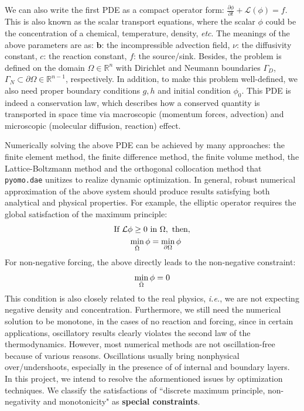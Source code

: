 \documentclass{article}
\begin{document}
We can also write the first PDE as a compact operator form: $\displaystyle {\frac{\partial \phi}{\partial t}}  + \mathcal{L}(\phi) =f$. This is also known as the scalar transport equations, where the scalar $\phi$ could be the concentration of a chemical, temperature, density, {\it{etc}}. The meanings of the above parameters are as: $\mathbf{b}$: the incompressible advection field, $\nu$: the diffusivity constant, $c$: the reaction constant, $f$: the source/sink. Besides, the problem is defined on the domain $\Omega \in \mathbb{R}^n$ with Dirichlet and Neumann boundaries $\Gamma_D$, $\Gamma_N \subset \partial \Omega \in \mathbb{R}^{n-1}$, respectively. In addition, to make this problem well-defined, we also need proper boundary conditions $g,h$ and initial condition $\phi_0$. This PDE is indeed a conservation law, which describes how a conserved quantity is transported in space time via macroscopic (momentum forces, advection) and microscopic (molecular diffusion, reaction) effect. \par

Numerically solving the above PDE can be achieved by many approaches: the finite element method\cite{evans2009enforcement}, the finite difference method\cite{stynes18}, the finite volume method\cite{lazarov1996finite}, the Lattice-Boltzmann method\cite{chai2013lattice} and the orthogonal collocation method\cite{biegler2010nonlinear} \cite{nicholson2018pyomo} that \texttt{pyomo.dae} unitizes to realize dynamic optimization. In general, robust numerical approximation of the above system should produce results satisfying both analytical and physical properties\cite{evans2009enforcement}. For example, the elliptic operator requires the global satisfaction of the maximum principle\cite{burman2005stabilized}\cite{evans2009enforcement}:
\begin{align*}
    \text{If} \ \mathcal{L}\phi \geq 0 \ &\text{in} \ \Omega, \ \text{then},\\
    \min_{\Bar{\Omega}} \phi &= \min_{\partial \Omega} \phi 
\end{align*}
For non-negative forcing, the above directly leads to the non-negative constraint:
\begin{equation*}
    \min_{\Bar{\Omega}} \phi = 0
\end{equation*}
This condition is also closely related to the real physics, {\it{i.e.}}, we are not expecting negative density and concentration. Furthermore, we still need the numerical solution to be monotone, in the cases of no reaction and forcing, since in certain applications, oscillatory results clearly violates the second law of the thermodynamics. However, most numerical methods are not oscillation-free because of various reasons\cite{john2018finite}. Oscillations usually bring nonphysical over/undershoots, especially in the presence of of internal and boundary layers.  In this project, we intend to resolve the aformentioned issues by optimization techniques. We classify the satisfactions of ``discrete maximum principle, non-negativity and monotonicity" as \textbf{special constraints}.
\end{document}
